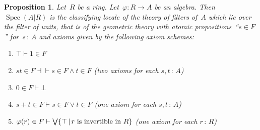 \documentclass[10pt,reqno,a4paper]{amsbook}
\theoremstyle{definition}
\theoremstyle{plain}
\newtheorem{prop}[defn]{Proposition}
\theoremstyle{remark}
\DeclareMathOperator{\Spec}{Spec}
\newcommand{\?}{\,{:}\,}
\renewcommand{\_}{\mathpunct{.}\,}
\begin{document}
\begin{prop}\label{prop:local-spectrum-classify}
Let~$R$ be a ring. Let~$\varphi : R \to A$ be an algebra. Then~$\Spec(A|R)$ is
the classifying locale of the theory of filters of~$A$ which lie over the
filter of units, that is of the geometric theory with atomic propositions~``$s
\in F$'' for~$s\?A$ and axioms given by the following axiom schemes:
\begin{enumerate}
\item $\top \vdash 1 \in F$
\item $st \in F \dashv\vdash s \in F \wedge t \in F$ (two axioms for each $s,t\?A$)
\item $0 \in F \vdash \bot$
\item $s+t \in F \vdash s \in F \vee t \in F$ (one axiom for each $s,t\?A$)
\item $\varphi(r) \in F \vdash \bigvee \{ \top \,|\, \textnormal{$r$ is invertible in
$R$} \}$ (one axiom for each $r\?R$)
\end{enumerate}
\end{prop}
\end{document}

